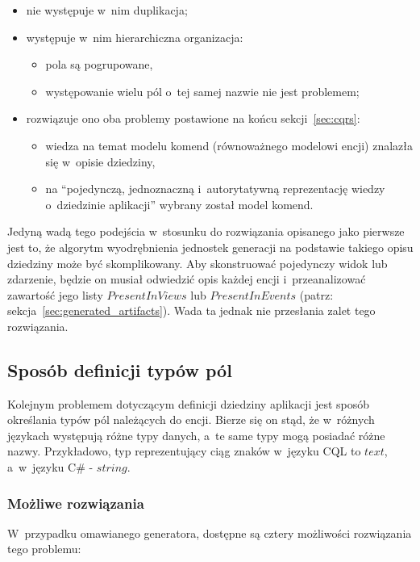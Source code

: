 \begin{itemize}
 \item nie występuje w~nim duplikacja;
 \item występuje w~nim hierarchiczna organizacja:
 \begin{itemize}
  \item pola są pogrupowane,
  \item występowanie wielu pól o~tej samej nazwie nie jest problemem;
 \end{itemize}
 \item rozwiązuje ono oba problemy postawione na końcu sekcji~\ref{sec:cqrs}:
  \begin{itemize}
   \item wiedza na temat modelu komend (równoważnego modelowi encji) znalazła się w~opisie dziedziny,
   \item na ``pojedynczą, jednoznaczną i~autorytatywną reprezentację wiedzy o~dziedzinie aplikacji'' wybrany został model komend.
  \end{itemize}
\end{itemize}

Jedyną wadą tego podejścia w~stosunku do rozwiązania opisanego jako pierwsze jest to, że algorytm wyodrębnienia jednostek generacji na podstawie takiego opisu dziedziny może być skomplikowany.
Aby skonstruować pojedynczy widok lub zdarzenie, będzie on musiał odwiedzić opis każdej encji i~przeanalizować zawartość jego listy $PresentInViews$ lub $PresentInEvents$ (patrz: sekcja~\ref{sec:generated_artifacts}).
Wada ta jednak nie przesłania zalet tego rozwiązania.


\subsection{Sposób definicji typów pól} \label{sec:field_type_definition}

Kolejnym problemem dotyczącym definicji dziedziny aplikacji jest sposób określania typów pól należących do encji.
Bierze się on stąd, że w~różnych językach występują różne typy danych, a~te same typy mogą posiadać różne nazwy.
Przykładowo, typ reprezentujący ciąg znaków w~języku CQL to $text$, a~w~języku C\# - $string$.

\subsubsection{Możliwe rozwiązania}

W~przypadku omawianego generatora, dostępne są cztery możliwości rozwiązania tego problemu:

